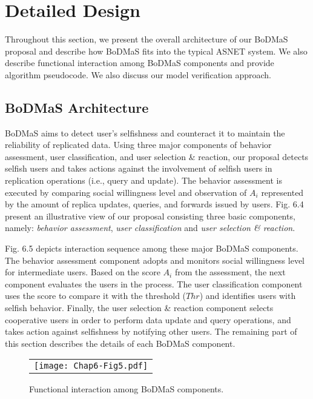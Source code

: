 \section{Detailed Design}\label{Chap6_04}
Throughout this section, we present the overall architecture of our BoDMaS proposal and describe how BoDMaS fits into the typical ASNET system. We also describe functional interaction among BoDMaS components and provide algorithm pseudocode. We also discuss our model verification approach.

\subsection{BoDMaS Architecture}\label{Chap6_04_01}
BoDMaS aims to detect user's selfishness and counteract it to maintain the reliability of replicated data. Using three major components of behavior assessment, user classification, and user selection \& reaction, our proposal detects selfish users and takes actions against the involvement of selfish users in replication operations (i.e., query and update). The behavior assessment is executed by comparing social willingness level and observation of $A_i$ represented by the amount of replica updates, queries, and forwards issued by users. Fig. 6.4 present an illustrative view of our proposal consisting three basic components, namely: {\it behavior assessment}, {\it user classification} and {\it user selection \& reaction}.

Fig. 6.5 depicts interaction sequence among these major BoDMaS components. The behavior assessment component adopts and monitors social willingness level for intermediate users. Based on the score $A_i$ from the assessment, the next component evaluates the users in the process. The user classification component uses the score to compare it with the threshold ($Thr$) and identifies users with selfish behavior. Finally, the user selection \& reaction component selects cooperative users in order to perform data update and query operations, and takes action against selfishness by notifying other users. The remaining part of this section describes the details of each BoDMaS component.
\begin{figure}[t]
\begin{center}
  \begin{tabular}{c}
  \texttt{[image: Chap6-Fig5.pdf]}
  \end{tabular}
  \caption{Functional interaction among BoDMaS components.}
\end{center}
\end{figure}

